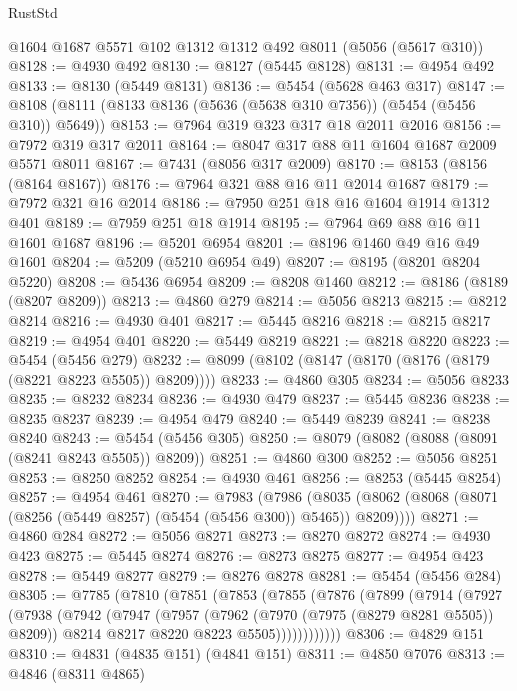 \begin{lexlean}{RustStd}
\begin{coremodule}
    @1604
    @1687
    @5571
    @102
    @1312
    @1312
    @492
    @8011
    (@5056 (@5617 @310))
@8128 := @4930 @492
@8130 := @8127 (@5445 @8128)
@8131 := @4954 @492
@8133 := @8130 (@5449 @8131)
@8136 := @5454 (@5628 @463 @317)
@8147 := @8108 (@8111 (@8133 @8136 (@5636 (@5638 @310 @7356)) (@5454 (@5456 @310)) @5649))
@8153 := @7964 @319 @323 @317 @18 @2011 @2016
@8156 := @7972 @319 @317 @2011
@8164 := @8047 @317 @88 @11 @1604 @1687 @2009 @5571 @8011
@8167 := @7431 (@8056 @317 @2009)
@8170 := @8153 (@8156 (@8164 @8167))
@8176 := @7964 @321 @88 @16 @11 @2014 @1687
@8179 := @7972 @321 @16 @2014
@8186 := @7950 @251 @18 @16 @1604 @1914 @1312 @401
@8189 := @7959 @251 @18 @1914
@8195 := @7964 @69 @88 @16 @11 @1601 @1687
@8196 := @5201 @6954
@8201 := @8196 @1460 @49 @16 @49 @1601
@8204 := @5209 (@5210 @6954 @49)
@8207 := @8195 (@8201 @8204 @5220)
@8208 := @5436 @6954
@8209 := @8208 @1460
@8212 := @8186 (@8189 (@8207 @8209))
@8213 := @4860 @279
@8214 := @5056 @8213
@8215 := @8212 @8214
@8216 := @4930 @401
@8217 := @5445 @8216
@8218 := @8215 @8217
@8219 := @4954 @401
@8220 := @5449 @8219
@8221 := @8218 @8220
@8223 := @5454 (@5456 @279)
@8232 := @8099 (@8102 (@8147 (@8170 (@8176 (@8179 (@8221 @8223 @5505)) @8209))))
@8233 := @4860 @305
@8234 := @5056 @8233
@8235 := @8232 @8234
@8236 := @4930 @479
@8237 := @5445 @8236
@8238 := @8235 @8237
@8239 := @4954 @479
@8240 := @5449 @8239
@8241 := @8238 @8240
@8243 := @5454 (@5456 @305)
@8250 := @8079 (@8082 (@8088 (@8091 (@8241 @8243 @5505)) @8209))
@8251 := @4860 @300
@8252 := @5056 @8251
@8253 := @8250 @8252
@8254 := @4930 @461
@8256 := @8253 (@5445 @8254)
@8257 := @4954 @461
@8270 := @7983
    (@7986 (@8035 (@8062 (@8068 (@8071 (@8256 (@5449 @8257) (@5454 (@5456 @300)) @5465)) @8209))))
@8271 := @4860 @284
@8272 := @5056 @8271
@8273 := @8270 @8272
@8274 := @4930 @423
@8275 := @5445 @8274
@8276 := @8273 @8275
@8277 := @4954 @423
@8278 := @5449 @8277
@8279 := @8276 @8278
@8281 := @5454 (@5456 @284)
@8305 := @7785
    (@7810
      (@7851
        (@7853
          (@7855
            (@7876
              (@7899
                (@7914
                  (@7927
                    (@7938
                      (@7942
                        (@7947
                          (@7957
                            (@7962 (@7970 (@7975 (@8279 @8281 @5505)) @8209))
                            @8214
                            @8217
                            @8220
                            @8223
                            @5505))))))))))))
@8306 := @4829 @151
@8310 := @4831 (@4835 @151) (@4841 @151)
@8311 := @4850 @7076
@8313 := @4846 (@8311 @4865)

\end{coremodule}
\end{lexlean}
